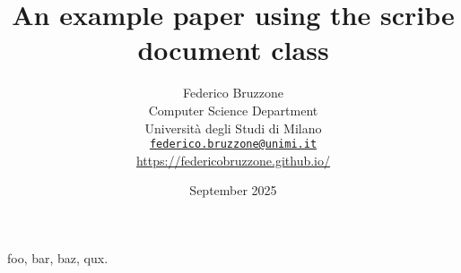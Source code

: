 \documentclass[
    lineno, %
    letterpaper, %
    twocolumn, %
]{scribe}
\title{\textbf{An example paper using the scribe document class}}
\author{
    Federico Bruzzone \orcidlink{0000-0002-8701-8853} \\
    Computer Science Department \\
    Università degli Studi di Milano \\
    \href{mailto:federico.bruzzone@unimi.it}{\texttt{federico.bruzzone@unimi.it}} \\
    \url{https://federicobruzzone.github.io/} 
}
\date{September 2025}
\begin{document}
\maketitle

\begin{abstract}
	\lipsum[1]
\end{abstract}

\begin{indexterms}
	foo, bar, baz, qux.
\end{indexterms}




\end{document}
